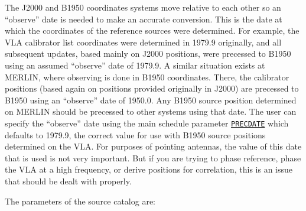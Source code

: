 \documentclass{report}
\begin{document}
The J2000 and B1950 coordinates systems move relative to each other so
an ``observe'' date is needed to make an accurate conversion.  This is
the date at which the coordinates of the reference sources were
determined.  For example, the VLA calibrator list coordinates were
determined in 1979.9 originally, and all subsequent updates, based
mainly on J2000 positions, were precessed to B1950 using an assumed
``observe'' date of 1979.9.  A similar situation exists at MERLIN,
where observing is done in B1950 coordinates.  There, the calibrator
positions (based again on positions provided originally in J2000) are
precessed to B1950 using an ``observe'' date of 1950.0.  Any B1950
source position determined on MERLIN should be precessed to other
systems using that date.  The user can specify the ``observe'' date
using the main schedule parameter 
{\hyperref[MP:PRECDATE]{{\tt PRECDATE}}}
which defaults to 1979.9, the correct value for use with
B1950 source positions determined on the VLA.  For purposes of
pointing antennas, the value of this date that is used is not very
important.  But if you are trying to phase reference, phase the VLA at
a high frequency, or derive positions for correlation, this is an
issue that should be dealt with properly.

The parameters of the source catalog are:
\end{document}
